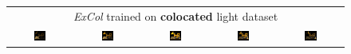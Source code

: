\begin{figure}[!htb]
\begin{tabular*}{\textwidth}{ c c c c c }
        \multicolumn{5}{c}{\textit{ExCol} trained on \textbf{colocated} light dataset} \\
          \includegraphics[width=0.2\textwidth]{figures/results/arb_set/dynamic_light/excol_col_vc0_ld-90.png}
        & \includegraphics[width=0.2\textwidth]{figures/results/arb_set/dynamic_light/excol_col_vc0_ld-60.png}
        & \includegraphics[width=0.2\textwidth]{figures/results/arb_set/dynamic_light/excol_col_vc0_ld0.png}
        & \includegraphics[width=0.2\textwidth]{figures/results/arb_set/dynamic_light/excol_col_vc0_ld60.png} 
        & \includegraphics[width=0.2\textwidth]{figures/results/arb_set/dynamic_light/excol_col_vc0_ld90.png} \\


\end{tabular*}
\end{figure}

